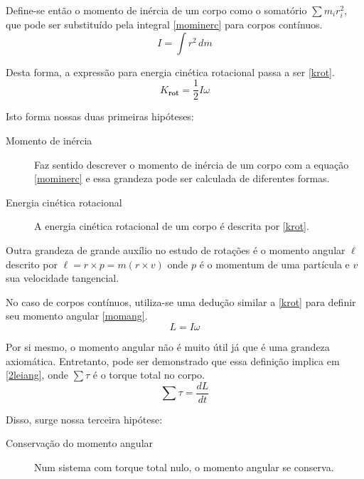 \documentclass[a4paper, 12pt]{article}
\begin{document}
    \par
    Define-se então o momento de inércia de um corpo como o somatório $\sum m_i r_i^2$, que pode ser substituído pela integral \eqref{mominerc} para corpos contínuos.
    \begin{equation}
        \label{mominerc}
        I=\int r^2\, dm
    \end{equation}
    \par
    Desta forma, a expressão para energia cinética rotacional passa a ser \eqref{krot}.
    \begin{equation}
        \label{krot}
        K_\textbf{rot} = \frac{1}{2} I \omega
    \end{equation}
    \par
    Isto forma nossas duas primeiras hipóteses:
    \begin{description}
        \item[Momento de inércia]{Faz sentido descrever o momento de inércia de um corpo com a equação \eqref{mominerc} e essa grandeza pode ser calculada de diferentes formas.}
        \item[Energia cinética rotacional]{A energia cinética rotacional de um corpo é descrita por \eqref{krot}}.
    \end{description}
    \par
    Outra grandeza de grande auxílio no estudo de rotações é o momento angular $\ell$ descrito por $\ell = r \times p = m(r \times v)$ onde $p$ é o momentum de uma partícula e $v$ sua velocidade tangencial.
    \par
    No caso de corpos contínuos, utiliza-se uma dedução similar a \eqref{krot} para definir seu momento angular \eqref{momang}.
    \begin{equation}
        \label{momang}
        L = I\omega
    \end{equation}
    \par
    Por si mesmo, o momento angular não é muito útil já que é uma grandeza axiomática. Entretanto, pode ser demonstrado que essa definição implica em \eqref{2leiang}, onde $\sum\tau$ é o torque total no corpo. 
    \begin{equation}
        \label{2leiang}
        \sum\tau = \frac{dL}{dt}
    \end{equation}
    \par
    Disso, surge nossa terceira hipótese:
    \begin{description}
        \item[Conservação do momento angular]{Num sistema com torque total nulo, o momento angular se conserva.}
    \end{description}
\end{document}
